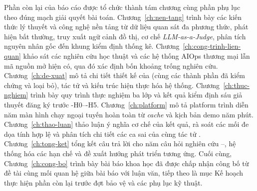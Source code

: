 Phần còn lại của báo cáo được tổ chức thành tám chương cùng phần phụ lục theo đúng mạch giải quyết bài toán. Chương~\ref{ch:nen-tang} trình bày các kiến thức lý thuyết và công nghệ nền tảng từ dữ liệu quan sát đa phương thức, phát hiện bất thường, truy xuất ngữ cảnh đồ thị, cơ chế \emph{LLM-as-a-Judge}, phân tích nguyên nhân gốc đến khung kiểm định thống kê. Chương~\ref{ch:cong-trinh-lien-quan} khảo sát các nghiên cứu học thuật và các hệ thống AIOps thương mại lẫn mã nguồn mở hiện có, qua đó xác định bốn khoảng trống nghiên cứu. Chương~\ref{ch:de-xuat} mô tả chi tiết thiết kế của \CTAV{} (cùng các thành phần đã kiểm chứng và loại bỏ), tác tử  và kiến trúc hiện thực hóa hệ thống. Chương~\ref{ch:thuc-nghiem} trình bày quy trình thực nghiệm ba lớp và kết quả kiểm định sáu giả thuyết đăng ký trước \hyp{H0}--\hyp{H5}. Chương~\ref{ch:platform} mô tả platform trình diễn năm màn hình chạy ngoại tuyến hoàn toàn từ \textit{cache} và kịch bản demo năm phút. Chương~\ref{ch:thao-luan} thảo luận ý nghĩa cơ chế của kết quả, rà soát các mối đe dọa tính hợp lệ và phân tích chi tiết các ca sai của \CTAV{} cùng tác tử . Chương~\ref{ch:tong-ket} tổng kết câu trả lời cho năm câu hỏi nghiên cứu --, hệ thống hóa các hạn chế và đề xuất hướng phát triển tương ứng. Cuối cùng, Chương~\ref{ch:cong-bo} trình bày bài báo khoa học đã được chấp nhận công bố từ đề tài cùng mối quan hệ giữa bài báo với luận văn, tiếp theo là mục Kế hoạch thực hiện phần còn lại trước đợt bảo vệ và các phụ lục kỹ thuật.